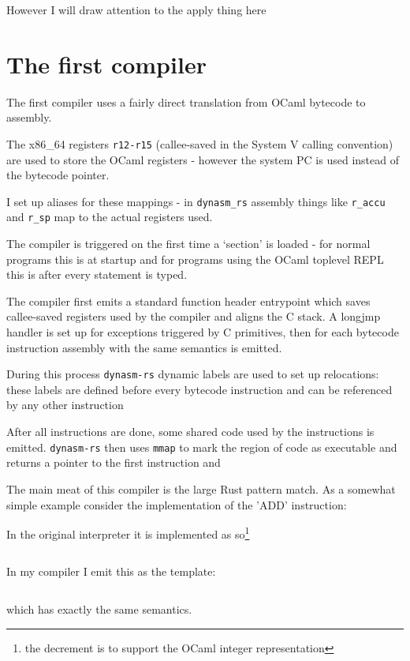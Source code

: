 However I will draw attention to the apply thing here

\section{The first compiler}

The first compiler uses a fairly direct translation from OCaml bytecode to assembly.

The x86\_64 registers \texttt{r12-r15} (callee-saved in the System V calling convention) are used
to store the OCaml registers - however the system PC is used instead of the bytecode pointer.

I set up aliases for these mappings - in \texttt{dynasm\_rs} assembly things like \texttt{r\_accu}
and
\texttt{r\_sp} map to the actual registers used.

The compiler is triggered on the first time a `section' is loaded - for normal programs this is at
startup and for programs using the OCaml toplevel REPL this is after every statement is typed.

The compiler first emits a standard function header entrypoint which saves callee-saved registers
used by the compiler and aligns the C stack. A longjmp handler is set up for exceptions triggered
by C primitives, then for each bytecode instruction assembly with the same semantics is emitted.

During this process \texttt{dynasm-rs} dynamic labels are used to set up relocations: these
labels are defined before every bytecode instruction and can be referenced by any other instruction

After all instructions are done, some shared code used by the instructions is emitted.
\texttt{dynasm-rs} then uses
\texttt{mmap} to mark the region of code as executable and returns a pointer to the first
instruction and

The main meat of this compiler is the large Rust pattern match. As a somewhat simple example
consider the implementation of the 'ADD' instruction:

In the original interpreter it is implemented as so\footnote{the decrement is to support the OCaml
    integer representation}

\inputminted{c}{snippets/add.c}

In my compiler I emit this as the template:

\inputminted{rust}{snippets/add.rs}

which has exactly the same semantics.

